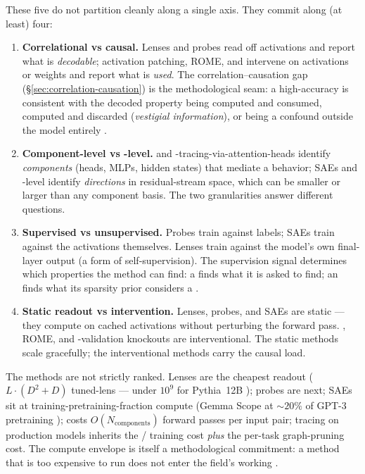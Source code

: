 These five do not partition cleanly along a single axis. They commit
along (at least) four:

\begin{enumerate}
  \item \textbf{Correlational vs causal.} Lenses and probes read off
    activations and report what is \emph{decodable}; activation
    patching, ROME, and  intervene on activations or
    weights and report what is \emph{used}. The correlation--causation
    gap (\S\ref{sec:correlation-causation}) is the
    methodological seam: a high-accuracy  is consistent with the
    decoded property being computed and consumed, computed and
    discarded (\emph{vestigial information}), or being a confound
    outside the model entirely \citep{belinkov2022-probing-survey}.
  \item \textbf{Component-level vs -level.} 
    and -tracing-via-attention-heads identify
    \emph{components} (heads, MLPs, hidden states) that mediate a
    behavior; SAEs and -level  identify
    \emph{directions} in residual-stream space, which can be smaller
    or larger than any component basis. The two granularities answer
    different questions.
  \item \textbf{Supervised vs unsupervised.} Probes train against
    labels; SAEs train against the activations themselves. Lenses
    train against the model's own final-layer output (a form of
    self-supervision). The supervision signal determines which
    properties the method can find: a  finds what it is asked to
    find; an  finds what its sparsity prior considers a .
  \item \textbf{Static readout vs intervention.} Lenses, probes, and
    SAEs are static --- they compute on cached activations without
    perturbing the forward pass. , ROME, and
    -validation knockouts are interventional. The static
    methods scale gracefully; the interventional methods carry the
    causal load.
\end{enumerate}

The methods are not strictly ranked. Lenses are the cheapest readout
($L \cdot (D^2 + D)$ tuned-lens  --- under $10^9$ for
Pythia~12B \citep{belrose2023-tuned-lens}); probes are next; SAEs sit
at training-pretraining-fraction compute (Gemma Scope at $\sim20\%$ of
GPT-3 pretraining \citep{gemma-scope-2024});  costs
$O(N_{\text{components}})$ forward passes per input pair; 
tracing on production models inherits the / training cost
\emph{plus} the per-task graph-pruning cost. The compute envelope is
itself a methodological commitment: a method that is too expensive to
run does not enter the field's working .

